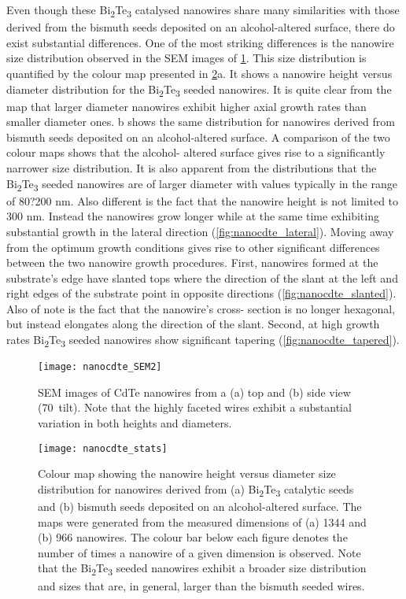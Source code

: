 Even though these Bi\textsubscript{2}Te\textsubscript{3} catalysed nanowires share
many similarities with those derived from the bismuth seeds
deposited on an alcohol-altered surface, there do exist
substantial differences. One of the most striking differences
is the nanowire size distribution observed in the SEM images
of \cref{fig:nanocdte_SEM2}. This size distribution is quantified by the colour
map presented in \cref{fig:nanocdte_stats}a. It shows a nanowire height
versus diameter distribution for the Bi\textsubscript{2}Te\textsubscript{3} seeded nanowires. It is quite clear from the map that larger diameter nanowires exhibit higher axial growth rates than smaller diameter ones. b shows the same distribution for nanowires derived 
from bismuth seeds deposited on an alcohol-altered surface. A 
comparison of the two colour maps shows that the alcohol- 
altered surface gives rise to a significantly narrower size 
distribution. It is also apparent from the distributions that the 
Bi\textsubscript{2}Te\textsubscript{3} seeded nanowires are of larger diameter with values typically in the range of 80?200 nm. Also different is the fact that the nanowire height is not limited to 300 nm. Instead the nanowires grow longer while at the same time exhibiting
substantial growth in the lateral direction (\cref{fig:nanocdte_lateral}).
Moving away from the optimum growth conditions gives
rise to other significant differences between the two nanowire
growth procedures. First, nanowires formed at the substrate's
edge have slanted tops where the direction of the slant at the
left and right edges of the substrate point in opposite directions
(\cref{fig:nanocdte_slanted}). Also of note is the fact that the nanowire's cross-
section is no longer hexagonal, but instead elongates along the
direction of the slant. Second, at high growth rates Bi\textsubscript{2}Te\textsubscript{3}
seeded nanowires show significant tapering (\cref{fig:nanocdte_tapered}).
\begin{figure}
    \centering
    \texttt{[image: nanocdte\_SEM2]}
    \caption{\label{fig:nanocdte_SEM2}SEM images of CdTe nanowires from a (a) top and (b) side view (70\degree~tilt). Note that the highly faceted wires exhibit a substantial variation in both heights and diameters.}
\end{figure}
\begin{figure}
    \centering
    \texttt{[image: nanocdte\_stats]}
    \caption{\label{fig:nanocdte_stats}Colour map showing the nanowire height versus diameter size distribution for nanowires derived from (a) Bi\textsubscript{2}Te\textsubscript{3} catalytic seeds
        and (b) bismuth seeds deposited on an alcohol-altered surface. The maps were generated from the measured dimensions of (a) 1344 and
        (b) 966 nanowires. The colour bar below each figure denotes the number of times a nanowire of a given dimension is observed. Note that the
        Bi\textsubscript{2}Te\textsubscript{3} seeded nanowires exhibit a broader size distribution and sizes that are, in general, larger than the bismuth seeded wires.}
\end{figure}
